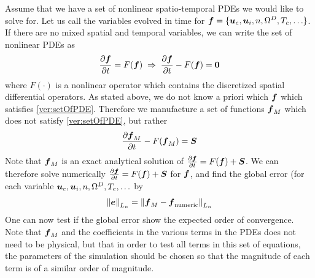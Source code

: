Assume that we have a set of nonlinear spatio-temporal PDEs we would like to solve for.
Let us call the variables evolved in time for $\boldsymbol{f}=\{\boldsymbol{u}_e, \boldsymbol{u}_i, n, \Omega^D, T_e, \ldots\}$.
If there are no mixed spatial and temporal variables, we can write the set of nonlinear PDEs as
%
\begin{align}
  \frac{\partial {\boldsymbol{f}}}{\partial{t}} = F(\boldsymbol{f}) \; \Rightarrow \; \frac{\partial {\boldsymbol{f}}}{\partial{t}} - F(\boldsymbol{f}) = \boldsymbol{0}
  \label{ver:setOfPDE}
\end{align}
%
where $F(\cdot)$ is a nonlinear operator which contains the discretized spatial differential operators.
As stated above, we do not know a priori which $\boldsymbol{f}$ which satisfies \cref{ver:setOfPDE}.
Therefore we manufacture a set of functions $\boldsymbol{f}_M$ which does not satisfy \cref{ver:setOfPDE}, but rather
%
\begin{align*}
    \frac{\partial {\boldsymbol{f}_M}}{\partial{t}} - F(\boldsymbol{f}_M) = \boldsymbol{S}
\end{align*}
%
Note that $\boldsymbol{f}_M$ is an exact analytical solution of $\frac{\partial {\boldsymbol{f}}}{\partial{t}} = F(\boldsymbol{f}) + \boldsymbol{S}$.
We can therefore solve numerically $\frac{\partial {\boldsymbol{f}}}{\partial{t}} = F(\boldsymbol{f}) + \boldsymbol{S}$ for $\boldsymbol{f}$, and find the global error (for each variable $\boldsymbol{u}_e, \boldsymbol{u}_i, n, \Omega^D, T_e, \ldots$ by
%
\begin{align*}
    \left\|\boldsymbol{e}\right\|_{L_n} =
    \left\|\boldsymbol{f}_{M} - \boldsymbol{f}_{\text{numeric}}\right\|_{L_n}
\end{align*}
%
One can now test if the global error show the expected order of convergence.
Note that $\boldsymbol{f}_M$ and the coefficients in the various terms in the PDEs does not need to be physical, but that in order to test all terms in this set of equations, the parameters of the simulation should be chosen so that the magnitude of each term is of a similar order of magnitude.

